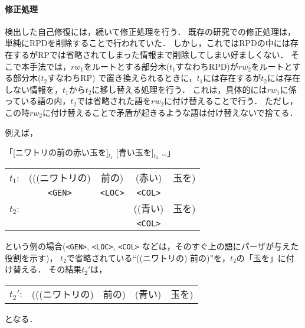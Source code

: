 \paragraph{修正処理}
検出した自己修復には，続いて修正処理を行う．
既存の研究での修正処理は，単純にRPDを削除することで行われていた．
しかし，これではRPDの中には存在するがRPでは省略されてしまった情報まで削除してしまい好ましくない．
そこで本手法では，$rw_1$をルートとする部分木($t_1$すなわちRPD)が$rw_2$をルートとする部分木($t_2$すなわちRP)
で置き換えられるときに，$t_1$には存在するが$t_2$には存在しない情報を，$t_1$から$t_2$に移し替える処理を行う．
これは，具体的には$rw_1$に係っている語の内，$t_2$では省略された語を$rw_2$に付け替えることで行う．
ただし，この時$rw_2$に付け替えることで矛盾が起きるような語は付け替えないで捨てる．

例えば，
\begin{center}
\begin{mbox}
「[ニワトリの前の赤い玉を]$_{t_1}$ [青い玉を]$_{t_2}$ \ldots」\\
\begin{tabular}{lcccc}
$t_1$:& (((ニワトリの) &  前の) & (赤い) & 玉を)\\
      &\verb+<GEN>+ &\verb+<LOC>+&\verb+<COL>+\\
$t_2$:&              &           & ((青い) & 玉を)\\
      &              &        &\verb+<COL>+\\
\end{tabular}
\end{mbox}
\end{center}
という例の場合(\verb+<GEN>+, \verb+<LOC>+, \verb+<COL>+ などは，そのすぐ上の語にパーザが与えた役割を示す)，
$t_2$で省略されている``((ニワトリの) 前の)''を，$t_2$の「玉を」に付け替える．
その結果$t_2'$は，
\begin{center}
\begin{tabular}{lcccc}
$t_2'$:& (((ニワトリの) & 前の) & (青い) & 玉を)\\
\end{tabular}
\end{center}
となる．

